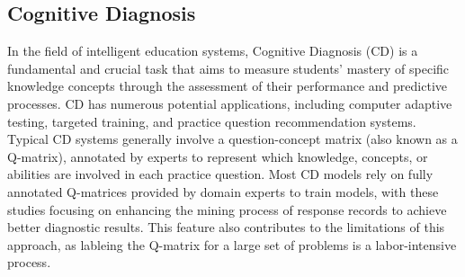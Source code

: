 \begin{survey}
\subsection{Cognitive Diagnosis}
In the field of intelligent education systems, Cognitive Diagnosis (CD)\cite{liu2023new} is a fundamental and crucial task that aims to measure students' mastery of specific knowledge concepts through the assessment of their performance and predictive processes. CD has numerous potential applications, including computer adaptive testing, targeted training, and practice question recommendation systems. Typical CD systems generally involve a question-concept matrix (also known as a Q-matrix), annotated by experts to represent which knowledge, concepts, or abilities are involved in each practice question. Most CD models rely on fully annotated Q-matrices provided by domain experts to train models, with these studies focusing on enhancing the mining process of response records to achieve better diagnostic results. This feature also contributes to the limitations of this approach, as lableing the Q-matrix for a large set of problems is a labor-intensive process.



% 

\printbibliography

\end{survey}
